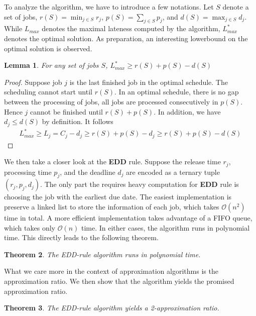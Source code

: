\documentclass[11pt,psfig,times]{article}
\newcommand*{\bigo}[1]{\mathcal{O}(#1)}
\newtheorem{theorem}{Theorem}
\newtheorem{lemma}[theorem]{Lemma}
\begin{document}
To analyze the algorithm, we have to introduce a few notations. Let $S$ denote a set of jobs, $r(S) = \min_{j \in S} r_j$, $p(S) = \sum_{j \in S} p_j$, 
and $d(S) = \max_{j \in S} d_j$. While $L_{max}$ denotes the maximal lateness computed by the algorithm, $L_{max}^*$ denotes the optimal solution. 
As preparation, an interesting lowerbound on the optimal solution is observed. 
\begin{lemma}
    \label{lemma:lowerbound}
    For any set of jobs $S$, $L_{max}^* \geq r(S) + p(S) - d(S)$
\end{lemma}
\begin{proof}
    Suppose job $j$ is the last finished job in the optimal schedule. The scheduling cannot start until $r(S)$. In an optimal schedule, there is no gap between the processing of jobs, all jobs 
    are processed consecutively in $p(S)$. Hence $j$ cannot be finished until $r(S) + p(S)$. In addition, we have $d_j \leq d(S)$ by definition. It follows 
    \begin{align*}
        L_{max}^* \geq L_j = C_j - d_j \geq r(S) + p(S) - d_j \geq r(S) + p(S) - d(S)
    \end{align*} 
\end{proof}
We then take a closer look at the \textbf{EDD} rule. Suppose the release time $r_j$, processing time $p_j$, and the deadline $d_j$ are encoded as a ternary tuple $(r_j, p_j, d_j)$.
The only part the requires heavy computation for \textbf{EDD} rule is choosing the job with the earliest due date.
The easiest implementation is preserve a linked list to store the information of each job, which takes $\bigo{n^2}$ time in total. 
A more efficient implementation takes advantage of a FIFO queue, which takes only $\bigo{n}$ time. In either cases, 
the algorithm runs in polynomial time. This directly leads to the following theorem.
\begin{theorem}
    The EDD-rule algorithm runs in polynomial time. 
\end{theorem}
What we care more in the context of approximation algorithms is the approximation ratio. We then show that the algorithm yields the promised approximation ratio.
\begin{theorem}
    The EDD-rule algorithm yields a 2-approximation ratio.
\end{theorem}
\end{document}
